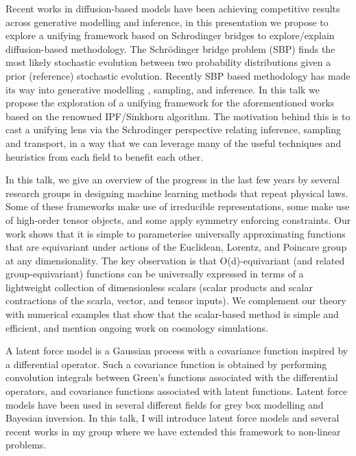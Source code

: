\documentclass[a4paper,UKenglish]{dagrep-v2018}
\begin{document}
Recent works in diffusion-based models have been achieving competitive results across generative modelling and inference, in this presentation we propose to explore a unifying framework based on Schrodinger bridges to explore/explain diffusion-based methodology. The Schrödinger bridge problem (SBP) finds the most likely stochastic evolution between two probability distributions given a prior (reference) stochastic evolution. Recently SBP based methodology has made its way into generative modelling , sampling, and inference. In this talk we propose the exploration of a unifying framework for the aforementioned works based on the renowned IPF/Sinkhorn algorithm. The motivation behind this is to cast a unifying lens via the Schrodinger perspective relating inference, sampling and transport, in a way that we can leverage many of the useful techniques and heuristics from each field to benefit each other.

\license

In this talk, we give an overview of the progress in the last few years by several research groups in designing machine learning methods that repeat physical laws. Some of these frameworks make use of irreducible representations, some make use of high-order tensor objects, and some apply symmetry enforcing constraints. Our work shows that it is simple to parameterise universally approximating functions that are equivariant under actions of the Euclidean, Lorentz, and Poincare group at any dimensionality. The key observation is that O(d)-equivariant (and related group-equivariant) functions can be universally expressed in terms of a lightweight collection of dimensionless scalars (scalar products and scalar contractions of the scarla, vector, and tensor inputs). We complement our theory with numerical examples that show that the scalar-based method is simple and efficient, and mention ongoing work on cosmology simulations.

\license

A latent force model is a Gaussian process with a covariance function inspired by a differential operator. Such a covariance function is obtained by performing convolution integrals between Green's functions associated with the differential operators, and covariance functions associated with latent functions. Latent force models have been used in several different fields for grey box modelling and Bayesian inversion. In this talk, I will introduce latent force models and several recent works in my group where we have extended this framework to non-linear problems.
\end{document}
